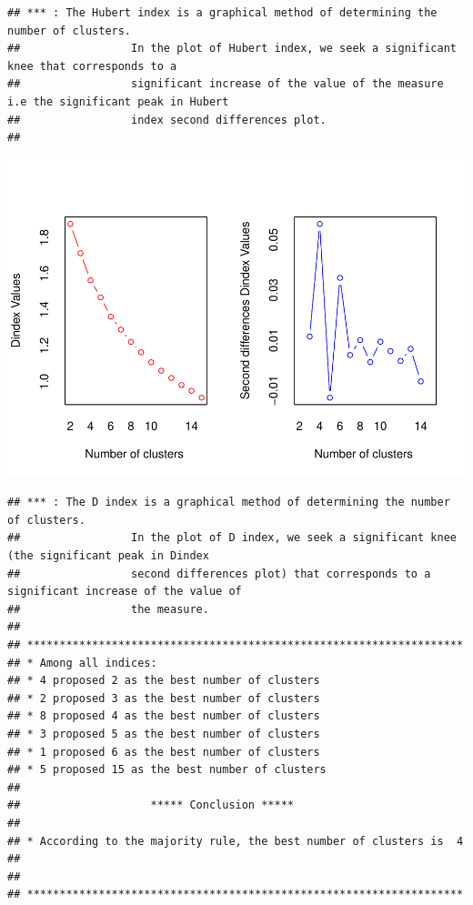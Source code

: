 \documentclass[
]{article}
\begin{document}
\begin{verbatim}
## *** : The Hubert index is a graphical method of determining the number of clusters.
##                 In the plot of Hubert index, we seek a significant knee that corresponds to a 
##                 significant increase of the value of the measure i.e the significant peak in Hubert
##                 index second differences plot. 
## 
\end{verbatim}

\includegraphics{Projet_files/figure-latex/unnamed-chunk-33-2.pdf}

\begin{verbatim}
## *** : The D index is a graphical method of determining the number of clusters. 
##                 In the plot of D index, we seek a significant knee (the significant peak in Dindex
##                 second differences plot) that corresponds to a significant increase of the value of
##                 the measure. 
##  
## ******************************************************************* 
## * Among all indices:                                                
## * 4 proposed 2 as the best number of clusters 
## * 2 proposed 3 as the best number of clusters 
## * 8 proposed 4 as the best number of clusters 
## * 3 proposed 5 as the best number of clusters 
## * 1 proposed 6 as the best number of clusters 
## * 5 proposed 15 as the best number of clusters 
## 
##                    ***** Conclusion *****                            
##  
## * According to the majority rule, the best number of clusters is  4 
##  
##  
## *******************************************************************
\end{verbatim}
\end{document}
